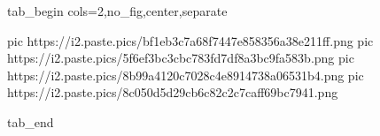  
 
 
 
 

\ifcmt
  tab_begin cols=2,no_fig,center,separate

     pic https://i2.paste.pics/bf1eb3c7a68f7447e858356a38e211ff.png
		 pic https://i2.paste.pics/5f6ef3bc3cbc783fd7df8a3bc9fa583b.png
		 pic https://i2.paste.pics/8b99a4120c7028c4e8914738a06531b4.png
		 pic https://i2.paste.pics/8c050d5d29cb6c82c2c7caff69bc7941.png

  tab_end
\fi
